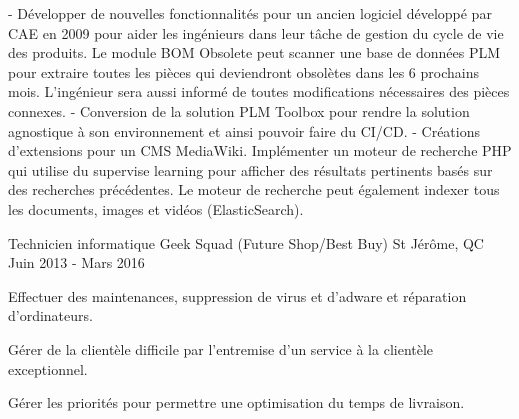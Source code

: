 \begin{cventries}
{\begin{cvitems}
\begin{cvsubentries}
{		}
		{
		    - Développer de nouvelles fonctionnalités pour un ancien logiciel développé par CAE en 2009 pour aider les ingénieurs dans leur tâche de gestion du cycle de vie des produits. Le module BOM Obsolete peut scanner une base de données PLM pour extraire toutes les pièces qui deviendront obsolètes dans les 6 prochains mois. L'ingénieur sera aussi informé de toutes modifications nécessaires des pièces connexes.\newline
            - Conversion de la solution PLM Toolbox pour rendre la solution agnostique à son environnement et ainsi pouvoir faire du CI/CD.
		}
		{
		    - Créations d'extensions pour un CMS MediaWiki. Implémenter un moteur de recherche PHP qui utilise du supervise learning pour afficher des résultats pertinents basés sur des recherches précédentes. Le moteur de recherche peut également indexer tous les documents, images et vidéos (ElasticSearch).
		}
		\end{cvsubentries}
      \end{cvitems}
    }
	
  \cventry
    {Technicien informatique}
    {Geek Squad (Future Shop/Best Buy)}
    {St Jérôme, QC}
    {Juin 2013 - Mars 2016}
    {
      \begin{cvitems}
        \item {Effectuer des maintenances, suppression de virus et d’adware et réparation d’ordinateurs.}
        \item {Gérer de la clientèle difficile par l'entremise d'un service à la clientèle exceptionnel.}
        \item {Gérer les priorités pour permettre une optimisation du temps de livraison.}
      \end{cvitems}
    }

\end{cventries}
